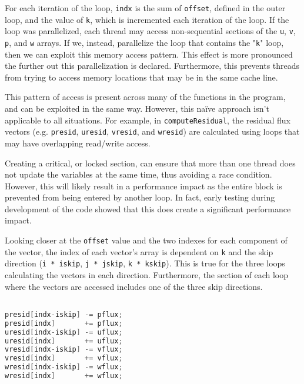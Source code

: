 \documentclass{article}
\begin{document}
  For each iteration of the loop, \verb|indx| is the sum of \verb|offset|,
  defined in the outer loop, and the value of \verb|k|, which is incremented
  each iteration of the loop. If the loop was parallelized, each thread may
  access non-sequential sections of the \verb|u|, \verb|v|, \verb|p|, and
  \verb|w| arrays. If we, instead, parallelize the loop that contains the
  "\verb|k|" loop, then we can exploit this memory access pattern. This effect
  is more pronounced the further out this parallelization is declared.
  Furthermore, this prevents threads from trying to access memory locations
  that may be in the same cache line. 
  
  This pattern of access is present across many of the functions in the 
  program, and can be exploited in the same way. However, this na\"{i}ve 
  approach isn't applicable to all situations. For example, in 
  \verb|computeResidual|, the residual flux vectors (e.g. \verb|presid|, 
  \verb|uresid|, \verb|vresid|, and \verb|wresid|) are calculated using loops
  that may have overlapping read/write access.

  Creating a critical, or locked section, can ensure that more than one thread 
  does not update the variables at the same time, thus avoiding a race 
  condition. However, this will likely result in a performance impact as the 
  entire block is prevented from being entered by another loop. In fact, early 
  testing during development of the code showed that this does create a 
  significant performance impact.

  Looking closer at the \verb|offset| value and the two indexes for each
  component of the vector, the index of each vector's array is dependent on
  \verb|k| and the skip direction (\verb|i * iskip|, \verb|j * jskip|, 
  \verb|k * kskip|). This is true for the three loops calculating the vectors
  in each direction. Furthermore, the section of each loop where the vectors
  are accessed includes one of the three skip directions.

  \begin{lstfloat}
  \begin{lstlisting}[language=C, 
                     linewidth=1\textwidth,
                     breaklines=true, 
                     basicstyle=\small\ttfamily]

presid[indx-iskip] -= pflux;
presid[indx]       += pflux;
uresid[indx-iskip] -= uflux;
uresid[indx]       += uflux;
vresid[indx-iskip] -= vflux;
vresid[indx]       += vflux;
wresid[indx-iskip] -= wflux;
wresid[indx]       += wflux;

  \end{lstlisting}
  \end{lstfloat}
\end{document}

